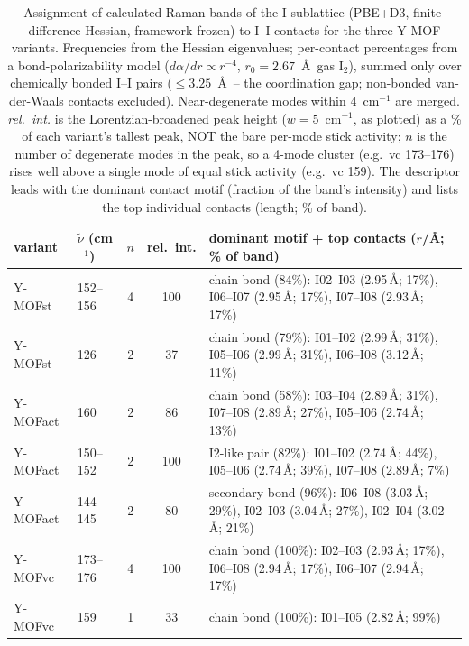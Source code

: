 \begin{table}[ht]
\centering
\caption{Assignment of calculated Raman bands of the I sublattice (PBE+D3, finite-difference Hessian, framework frozen) to I--I contacts for the three Y-MOF variants. Frequencies from the Hessian eigenvalues; per-contact percentages from a bond-polarizability model ($d\alpha/dr\propto r^{-4}$, $r_0=2.67$~\AA\ gas I$_2$), summed only over chemically bonded I--I pairs ($\le 3.25$~\AA\ -- the coordination gap; non-bonded van-der-Waals contacts excluded). Near-degenerate modes within 4~cm$^{-1}$ are merged. \emph{rel.\ int.} is the Lorentzian-broadened peak height ($w=5$~cm$^{-1}$, as plotted) as a \% of each variant's tallest peak, NOT the bare per-mode stick activity; $n$ is the number of degenerate modes in the peak, so a 4-mode cluster (e.g.\ vc 173--176) rises well above a single mode of equal stick activity (e.g.\ vc 159). The descriptor leads with the dominant contact motif (fraction of the band's intensity) and lists the top individual contacts (length; \% of band).}
\label{tab:raman_assignment}
\begin{tabular}{llccl}
\hline
variant & $\tilde\nu$ (cm$^{-1}$) & $n$ & rel.\ int. & dominant motif + top contacts ($r$/\AA; \% of band) \\
\hline
Y-MOFst & 152--156 & 4 & 100 & chain bond (84\%): I02--I03 (2.95\,\AA; 17\%), I06--I07 (2.95\,\AA; 17\%), I07--I08 (2.93\,\AA; 17\%) \\
Y-MOFst & 126 & 2 & 37 & chain bond (79\%): I01--I02 (2.99\,\AA; 31\%), I05--I06 (2.99\,\AA; 31\%), I06--I08 (3.12\,\AA; 11\%) \\
Y-MOFact & 160 & 2 & 86 & chain bond (58\%): I03--I04 (2.89\,\AA; 31\%), I07--I08 (2.89\,\AA; 27\%), I05--I06 (2.74\,\AA; 13\%) \\
Y-MOFact & 150--152 & 2 & 100 & I2-like pair (82\%): I01--I02 (2.74\,\AA; 44\%), I05--I06 (2.74\,\AA; 39\%), I07--I08 (2.89\,\AA; 7\%) \\
Y-MOFact & 144--145 & 2 & 80 & secondary bond (96\%): I06--I08 (3.03\,\AA; 29\%), I02--I03 (3.04\,\AA; 27\%), I02--I04 (3.02\,\AA; 21\%) \\
Y-MOFvc & 173--176 & 4 & 100 & chain bond (100\%): I02--I03 (2.93\,\AA; 17\%), I06--I08 (2.94\,\AA; 17\%), I06--I07 (2.94\,\AA; 17\%) \\
Y-MOFvc & 159 & 1 & 33 & chain bond (100\%): I01--I05 (2.82\,\AA; 99\%) \\
\hline
\end{tabular}
\end{table}
